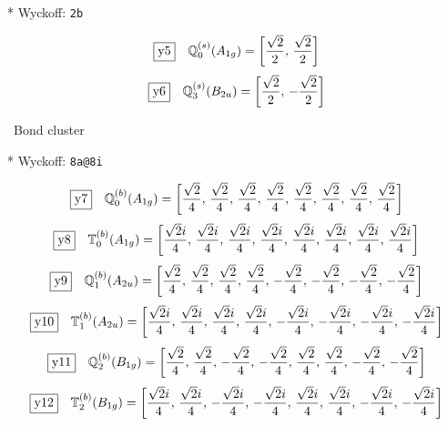 \documentclass[fleqn,10pt,landscape]{jsarticle}
\begin{document}
\noindent ** Wyckoff: \texttt{2b}

\begin{dmath*}
\fbox{y5}\quad \mathbb{Q}_{0}^{(s)}(A_{1g})=\left[ \frac{\sqrt{2}}{2},\, \frac{\sqrt{2}}{2} \right]
\end{dmath*}
\begin{dmath*}
\fbox{y6}\quad \mathbb{Q}_{3}^{(s)}(B_{2u})=\left[ \frac{\sqrt{2}}{2},\, - \frac{\sqrt{2}}{2} \right]
\end{dmath*}
\vspace{5mm}

\noindent\textbullet\, Bond cluster

\vspace{5mm}

\noindent ** Wyckoff: \texttt{8a@8i}

\begin{dmath*}
\fbox{y7}\quad \mathbb{Q}_{0}^{(b)}(A_{1g})=\left[ \frac{\sqrt{2}}{4},\, \frac{\sqrt{2}}{4},\, \frac{\sqrt{2}}{4},\, \frac{\sqrt{2}}{4},\, \frac{\sqrt{2}}{4},\, \frac{\sqrt{2}}{4},\, \frac{\sqrt{2}}{4},\, \frac{\sqrt{2}}{4} \right]
\end{dmath*}
\begin{dmath*}
\fbox{y8}\quad \mathbb{T}_{0}^{(b)}(A_{1g})=\left[ \frac{\sqrt{2} i}{4},\, \frac{\sqrt{2} i}{4},\, \frac{\sqrt{2} i}{4},\, \frac{\sqrt{2} i}{4},\, \frac{\sqrt{2} i}{4},\, \frac{\sqrt{2} i}{4},\, \frac{\sqrt{2} i}{4},\, \frac{\sqrt{2} i}{4} \right]
\end{dmath*}
\begin{dmath*}
\fbox{y9}\quad \mathbb{Q}_{1}^{(b)}(A_{2u})=\left[ \frac{\sqrt{2}}{4},\, \frac{\sqrt{2}}{4},\, \frac{\sqrt{2}}{4},\, \frac{\sqrt{2}}{4},\, - \frac{\sqrt{2}}{4},\, - \frac{\sqrt{2}}{4},\, - \frac{\sqrt{2}}{4},\, - \frac{\sqrt{2}}{4} \right]
\end{dmath*}
\begin{dmath*}
\fbox{y10}\quad \mathbb{T}_{1}^{(b)}(A_{2u})=\left[ \frac{\sqrt{2} i}{4},\, \frac{\sqrt{2} i}{4},\, \frac{\sqrt{2} i}{4},\, \frac{\sqrt{2} i}{4},\, - \frac{\sqrt{2} i}{4},\, - \frac{\sqrt{2} i}{4},\, - \frac{\sqrt{2} i}{4},\, - \frac{\sqrt{2} i}{4} \right]
\end{dmath*}
\begin{dmath*}
\fbox{y11}\quad \mathbb{Q}_{2}^{(b)}(B_{1g})=\left[ \frac{\sqrt{2}}{4},\, \frac{\sqrt{2}}{4},\, - \frac{\sqrt{2}}{4},\, - \frac{\sqrt{2}}{4},\, \frac{\sqrt{2}}{4},\, \frac{\sqrt{2}}{4},\, - \frac{\sqrt{2}}{4},\, - \frac{\sqrt{2}}{4} \right]
\end{dmath*}
\begin{dmath*}
\fbox{y12}\quad \mathbb{T}_{2}^{(b)}(B_{1g})=\left[ \frac{\sqrt{2} i}{4},\, \frac{\sqrt{2} i}{4},\, - \frac{\sqrt{2} i}{4},\, - \frac{\sqrt{2} i}{4},\, \frac{\sqrt{2} i}{4},\, \frac{\sqrt{2} i}{4},\, - \frac{\sqrt{2} i}{4},\, - \frac{\sqrt{2} i}{4} \right]
\end{dmath*}
\end{document}

